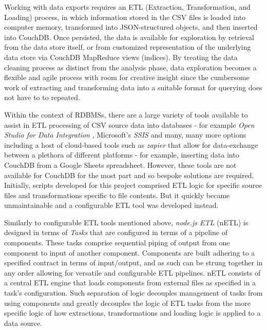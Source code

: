 Working with data exports requires an ETL (Extraction, Transformation, and Loading) process, in which information stored in the CSV files is loaded into computer memory, transformed into JSON-structured objects, and then inserted into CouchDB. Once persisted, the data is available for exploration by retrieval from the data store itself, or from customized representation of the underlying data store via CouchDB MapReduce views (indices). By treating the data cleaning process as distinct from the analysis phase, data exploration becomes a flexible and agile process with room for creative insight since the cumbersome work of extracting and transforming data into a suitable format for querying does not have to to repeated.

Within the context of RDBMSs, there are a large variety of tools available to assist in ETL processing of CSV source data into databases - for example \textit{Open Studio for Data Integration} \cite{talend}, Microsoft's \textit{SSIS} \cite{ssis} and many, many more options including a host of cloud-based tools such as \textit{zapier} \cite{zapier} that allow for data-exchange between a plethora of different platforms - for example, inserting data into CouchDB from a Google Sheets spreadsheet. However, these tools are not available for CouchDB for the most part and so bespoke solutions are required. Initially, scripts developed for this project comprised ETL logic for specific source files and transformations specific to file contents. But it quickly became unmaintainable and a configurable ETL tool was developed instead.

Similarly to configurable ETL tools mentioned above, \textit{node.js ETL} (nETL) is designed in terms of \textit{Tasks} that are configured in terms of a pipeline of components. These tasks comprise sequential piping of output from one component to input of another component. Components are built adhering to a specified contract in terms of input/output, and as such can be strung together in any order allowing for versatile and configurable ETL pipelines. nETL consists of a central ETL engine that loads components from external files as specified in a task's configuration. Such separation of logic decouples management of tasks from using components and greatly decouples the logic of ETL tasks from the more specific logic of how extractions, transformations and loading logic is applied to a data source.